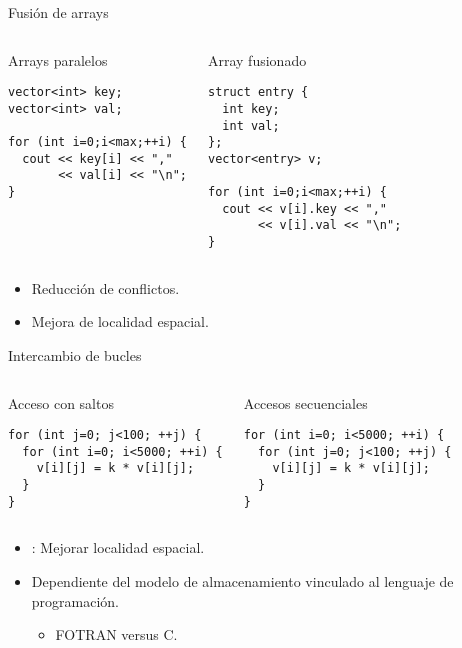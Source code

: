 \begin{frame}[t,fragile]{Fusión de arrays}
\begin{columns}[T]

\begin{block}{Arrays paralelos}
\begin{lstlisting}
vector<int> key;
vector<int> val;

for (int i=0;i<max;++i) {
  cout << key[i] << "," 
       << val[i] << "\n";
}
\end{lstlisting}
\end{block}

\pause
{}
\begin{block}{Array fusionado}
\begin{lstlisting}
struct entry {
  int key;
  int val;
};
vector<entry> v;

for (int i=0;i<max;++i) {
  cout << v[i].key << "," 
       << v[i].val << "\n";
}
\end{lstlisting}
\end{block}

\end{columns}

\begin{itemize}
  \item Reducción de conflictos.
  \item Mejora de localidad espacial.
\end{itemize}
\end{frame}

\begin{frame}[t,fragile]{Intercambio de bucles}
\begin{columns}[T]

\begin{block}{Acceso con saltos}
\begin{lstlisting}
for (int j=0; j<100; ++j) {
  for (int i=0; i<5000; ++i) {
    v[i][j] = k * v[i][j];
  }
}
\end{lstlisting}
\end{block}

\pause
{}
\begin{block}{Accesos secuenciales}
\begin{lstlisting}
for (int i=0; i<5000; ++i) {
  for (int j=0; j<100; ++j) {
    v[i][j] = k * v[i][j];
  }
}
\end{lstlisting}
\end{block}
\end{columns}

\begin{itemize}
  \item {}: Mejorar localidad espacial.
  \item Dependiente del modelo de almacenamiento vinculado al lenguaje de programación.
    \begin{itemize}
      \item FOTRAN versus C.
    \end{itemize}
\end{itemize}
\end{frame}

